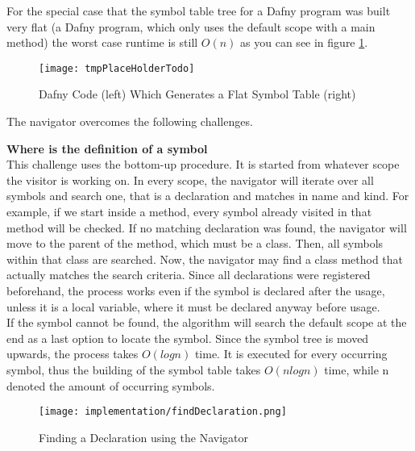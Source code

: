 For the special case that the symbol table tree for a Dafny program was built very flat
(a Dafny program, which only uses the default scope with a main method)
the worst case runtime is still $O(n)$ as you can see in figure \ref{fig:impl_symboltablenav_o_of_n}.

\begin{figure}[H]
    \centering
    \texttt{[image: tmpPlaceHolderTodo]}
    \caption{Dafny Code (left) Which Generates a Flat Symbol Table (right)}
    \label{fig:impl_symboltablenav_o_of_n}
\end{figure}

The navigator overcomes the following challenges.


\textbf{Where is the definition of a symbol}\\
This challenge uses the bottom-up procedure.
It is started from whatever scope the visitor is working on.
In every scope, the navigator will iterate over all symbols and search one, that is a declaration and matches in name and kind.
For example, if we start inside a method, every symbol already visited in that method will be checked.
If no matching declaration was found, the navigator will move to the parent of the method, which must be a class.
Then, all symbols within that class are searched.
Now, the navigator may find a class method that actually matches the search criteria.
Since all declarations were registered beforehand, the process works even if the symbol is declared after the usage, unless it is a local variable, where it must be declared anyway before usage.\\

If the symbol cannot be found, the algorithm will search the default scope at the end as a last option to locate the symbol.
Since the symbol tree is moved upwards, the process takes $O(logn)$ time.
It is executed for every occurring symbol, thus the building of the symbol table takes $O(nlogn)$ time, while n denoted the amount of occurring symbols.\\

\begin{figure}[H]
    \centering
    \texttt{[image: implementation/findDeclaration.png]}
    \caption{Finding a Declaration using the Navigator}
    \label{fig:findDecl}
\end{figure}

